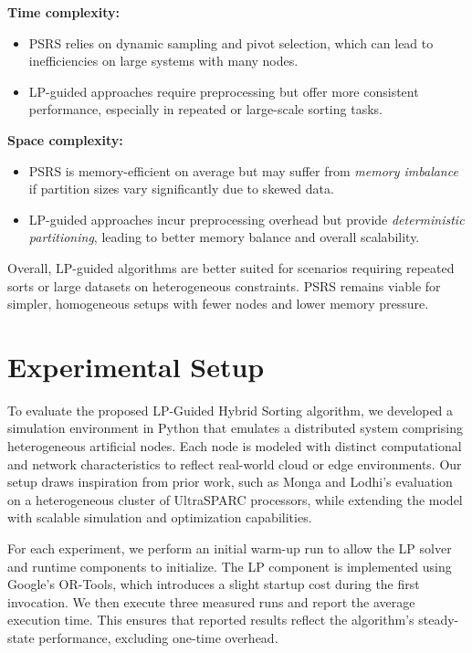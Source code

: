 \documentclass[]{interact}
\theoremstyle{plain}
\theoremstyle{definition}
\theoremstyle{remark}
\begin{document}
\textbf{Time complexity:}
\begin{itemize}
    \item PSRS relies on dynamic sampling and pivot selection, which can lead to inefficiencies on large systems with many nodes.
    \item LP-guided approaches require preprocessing but offer more consistent performance, especially in repeated or large-scale sorting tasks.
\end{itemize}

\textbf{Space complexity:}
\begin{itemize}
    \item PSRS is memory-efficient on average but may suffer from \textit{memory imbalance} if partition sizes vary significantly due to skewed data.
    \item LP-guided approaches incur preprocessing overhead but provide \textit{deterministic partitioning}, leading to better memory balance and overall scalability.
\end{itemize}

Overall, LP-guided algorithms are better suited for scenarios requiring repeated sorts or large datasets on heterogeneous constraints. PSRS remains viable for simpler, homogeneous setups with fewer nodes and lower memory pressure.


\section{Experimental Setup}

To evaluate the proposed LP-Guided Hybrid Sorting algorithm, we developed a simulation environment in Python that emulates a distributed system comprising heterogeneous artificial nodes. Each node is modeled with distinct computational and network characteristics to reflect real-world cloud or edge environments. Our setup draws inspiration from prior work, such as Monga and Lodhi’s evaluation on a heterogeneous cluster of UltraSPARC processors, while extending the model with scalable simulation and optimization capabilities.


For each experiment, we perform an initial warm-up run to allow the LP solver and runtime components to initialize. The LP component is implemented using Google's OR-Tools, which introduces a slight startup cost during the first invocation. We then execute three measured runs and report the average execution time. This ensures that reported results reflect the algorithm's steady-state performance, excluding one-time overhead.
\end{document}
